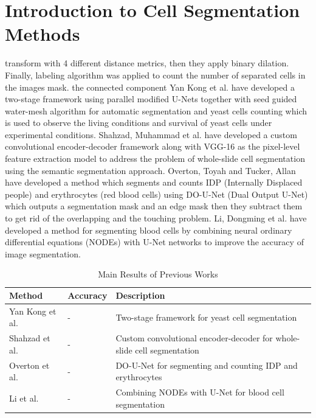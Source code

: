 \documentclass[conference]{IEEEtran}
\begin{document}
\section{Introduction to Cell Segmentation Methods}
transform with 4 different distance metrics, then they apply binary dilation. Finally, labeling algorithm was applied to count the number of separated cells in the images mask.
the connected component
Yan Kong et al. \cite{ref10} have developed a two-stage framework using parallel modified U-Nets together with seed guided water-mesh algorithm for automatic segmentation and yeast cells counting which is used to observe the living conditions and survival of yeast cells under experimental conditions.
Shahzad, Muhammad et al. \cite{ref11} have developed a custom convolutional encoder-decoder framework along with VGG-16 as the pixel-level feature extraction model to address the problem of whole-slide cell segmentation using the semantic segmentation approach. Overton, Toyah and Tucker, Allan \cite{ref12} have developed a method which segments and counts IDP (Internally Displaced people) and erythrocytes (red blood cells) using DO-U-Net (Dual Output U-Net) which outputs a segmentation mask and an edge mask then they subtract them to get rid of the overlapping and the touching problem. Li, Dongming et al. \cite{ref13} have developed a method for segmenting blood cells by combining neural ordinary differential equations (NODEs) with U-Net networks to improve the accuracy of image segmentation.
\begin{table}[htbp]
\centering
\caption{Main Results of Previous Works}
\label{tab:mainresults}
\begin{tabular}{lll}
\hline
Method & Accuracy & Description \\
\hline
Yan Kong et al. & - & Two-stage framework for yeast cell segmentation \\
Shahzad et al. & - & Custom convolutional encoder-decoder for whole-slide cell segmentation \\
Overton et al. & - & DO-U-Net for segmenting and counting IDP and erythrocytes \\
Li et al. & - & Combining NODEs with U-Net for blood cell segmentation \\
\hline
\end{tabular}
\end{table}
\end{document}
